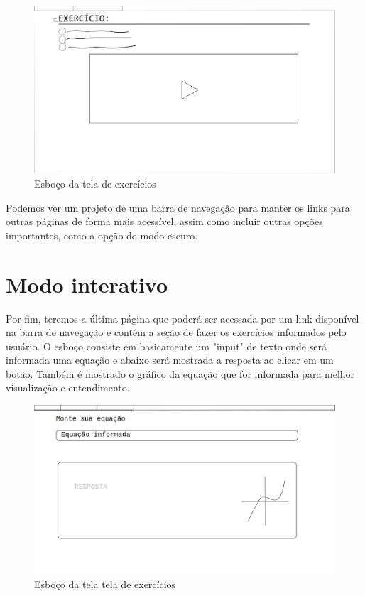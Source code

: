 \documentclass[12pt]{report}
\begin{document}
\begin{figure}[H]
    \includegraphics[width=1\textwidth]{img/A.jpg}
    \caption{Esboço da tela de exercícios}
\end{figure}

Podemos ver um projeto de uma barra de navegação para manter os links para outras páginas de forma mais acessível, assim como incluir outras opções importantes, como a opção do modo escuro.

\section{Modo interativo}
Por fim, teremos a última página que poderá ser acessada por um link disponível na barra de navegação e contém a seção de fazer os exercícios informados pelo usuário. O esboço consiste em basicamente um "input" de texto onde será informada uma equação e abaixo será mostrada a resposta ao clicar em um botão. Também é mostrado o gráfico da equação que for informada para melhor visualização e entendimento.

\begin{figure}[H]
    \includegraphics[width=1\textwidth]{img/d.png}
    \caption{Esboço da tela tela de exercícios}
\end{figure}
\end{document}

